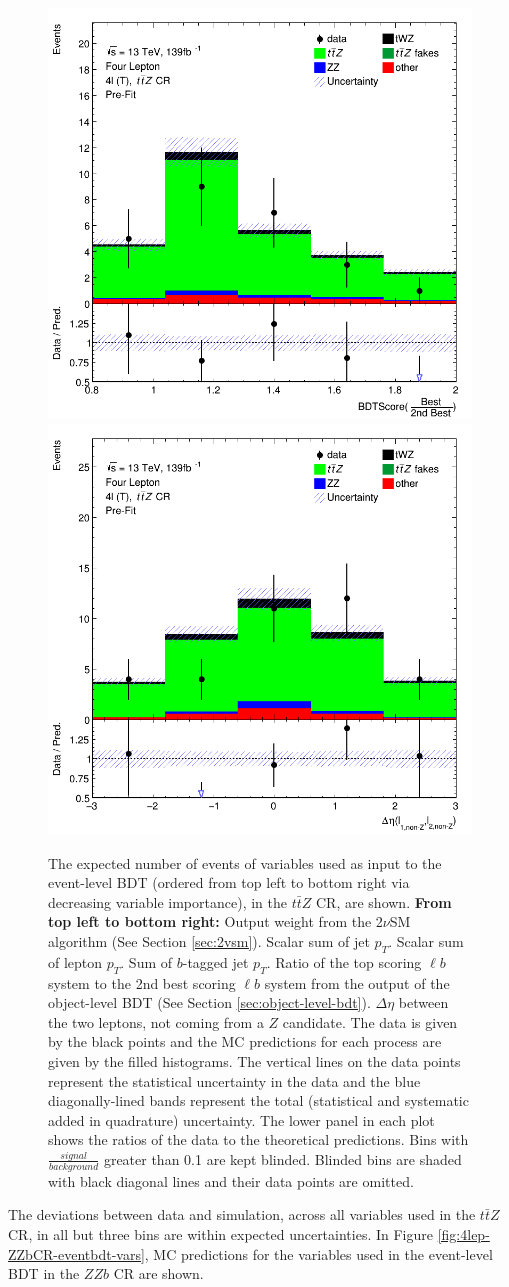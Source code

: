 \begin{figure}[htbp]
    \includegraphics[width=.3\textwidth]{figures/bdtPlots/lep4_ttZ_4T_BDT_Score_bestOver2ndBest.png} 
   \includegraphics[width=.3\textwidth]{figures/bdtPlots/lep4_ttZ_4T_delEta_lNonZ_lNonZ.png}

\caption{The expected number of events of variables used as input to the event-level BDT (ordered from top left to bottom right via decreasing variable importance), in the $t\bar{t}Z$ CR, are shown. \textbf{From top left to bottom right:} Output weight from the 2$\nu$SM algorithm (See Section \ref{sec:2vsm}). Scalar sum of jet $p_{T}$. Scalar sum of lepton $p_{T}$. Sum of $b$-tagged jet $p_{T}$. Ratio of the top scoring $\ell b$ system to the 2nd best scoring $\ell b$ system from the output of the object-level BDT (See Section \ref{sec:object-level-bdt}). $\Delta \eta$ between the two leptons, not coming from a $Z$ candidate. The data is given by the black points and the MC predictions for each process are given by the filled histograms. The vertical lines on the data points represent the statistical uncertainty in the data and the blue diagonally-lined bands represent the total (statistical and systematic added in quadrature) uncertainty. The lower panel in each plot shows the ratios of the data to the theoretical predictions. Bins with $\frac{signal}{background}$ greater than 0.1 are kept blinded. Blinded bins are shaded with black diagonal lines and their data points are omitted.}
  \label{fig:4lep-ttZCR-eventbdt-vars}
\end{figure}
The deviations between data and simulation, across all variables used in the $t\bar{t}Z$ CR, in all but three bins are within expected uncertainties. In Figure \ref{fig:4lep-ZZbCR-eventbdt-vars}, MC predictions for the variables used in the event-level BDT in the $ZZb$ CR are shown.
